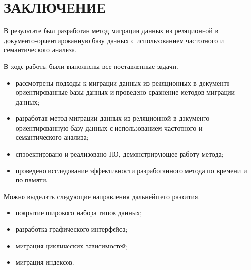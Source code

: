 \chapter*{ЗАКЛЮЧЕНИЕ}

В результате был разработан метод миграции данных из реляционной в
документо-ориентированную базу данных с
использованием частотного и семантического
анализа.

В ходе работы были выполнены все поставленные задачи.
\begin{itemize}[label=---]
    \item рассмотрены подходы к миграции данных из реляционных в документо-ориентированные
    базы данных и проведено сравнение методов миграции данных;
    \item разработан метод миграции данных из реляционной в документо-ориентированную базу данных с
    использованием частотного и семантического анализа;
    \item спроектировано и реализовано ПО, демонстрирующее работу метода;
    \item проведено исследование эффективности разработанного метода по времени и по памяти.
\end{itemize}

Можно выделить следующие направления дальнейшего развития.
\begin{itemize}[label=---]
    \item покрытие широкого набора типов данных;
    \item разработка графического интерфейса;
    \item миграция циклических зависимостей;
    \item миграция индексов.
\end{itemize}


